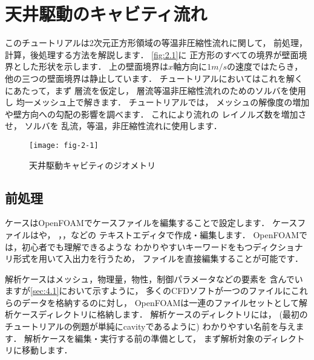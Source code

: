 \section{天井駆動のキャビティ流れ}
\label{sec:2.1}
%
%
%
このチュートリアルは2次元正方形領域の等温非圧縮性流れに関して，
前処理，計算，後処理する方法を解説します．
\autoref{fig:2.1}に
正方形のすべての境界が壁面境界とした形状を示します．
上の壁面境界は$x$軸方向に$1\unit{m/s}$の速度ではたらき，
他の三つの壁面境界は静止しています．
チュートリアルにおいてはこれを解くにあたって，まず
%
層流を仮定し，
層流等温非圧縮性流れのためのソルバを使用し
均一メッシュ上で解きます．
チュートリアルでは，
メッシュの解像度の増加や壁方向への勾配の影響を調べます．
これにより流れの
%
レイノルズ数を増加させ，
%
%
ソルバを
%
乱流，等温，非圧縮性流れに使用します．


\begin{figure}[ht]
 \texttt{[image: fig-2-1]}
 \caption{天井駆動キャビティのジオメトリ}
 \label{fig:2.1}
\end{figure}


\subsection{前処理}
\label{ssec:2.1.1}
ケースはOpenFOAMでケースファイルを編集することで設定します．
ケースファイルはや，
，，などの
テキストエディタで作成・編集します．
OpenFOAMでは，初心者でも理解できるような
わかりやすいキーワードをもつディクショナリ形式を用いて入出力を行うため，
ファイルを直接編集することが可能です．

解析ケースはメッシュ，物理量，物性，制御パラメータなどの要素を
含んでいますが\autoref{sec:4.1}において示すように，
多くのCFDソフトが一つのファイルにこれらのデータを格納するのに対し，
OpenFOAMは一連のファイルセットとして解析ケースディレクトリに格納します．
解析ケースのディレクトリには，
(最初のチュートリアルの例題が単純にcavityであるように)
わかりやすい名前を与えます．
解析ケースを編集・実行する前の準備として，
まず解析対象のディレクトリに移動します．


